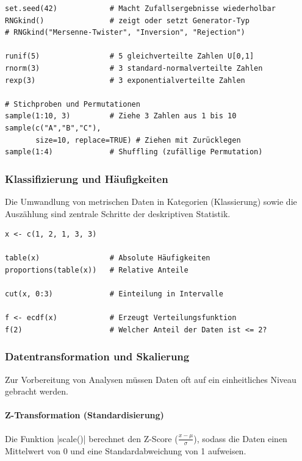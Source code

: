 \documentclass[10pt,twocolumn]{scrartcl}
\renewcommand{\lstinline}{\mycoloredinline}
\begin{document}
\begin{lstlisting}
set.seed(42)            # Macht Zufallsergebnisse wiederholbar
RNGkind()               # zeigt oder setzt Generator-Typ
# RNGkind("Mersenne-Twister", "Inversion", "Rejection")

runif(5)                # 5 gleichverteilte Zahlen U[0,1]
rnorm(3)                # 3 standard-normalverteilte Zahlen
rexp(3)                 # 3 exponentialverteilte Zahlen

# Stichproben und Permutationen
sample(1:10, 3)         # Ziehe 3 Zahlen aus 1 bis 10
sample(c("A","B","C"), 
       size=10, replace=TRUE) # Ziehen mit Zurücklegen
sample(1:4)             # Shuffling (zufällige Permutation)
\end{lstlisting}


\subsubsection{Klassifizierung und Häufigkeiten}

Die Umwandlung von metrischen Daten in Kategorien (Klassierung) sowie die Auszählung sind zentrale Schritte der deskriptiven Statistik.

\begin{lstlisting}
x <- c(1, 2, 1, 3, 3)

table(x)                # Absolute Häufigkeiten
proportions(table(x))   # Relative Anteile

cut(x, 0:3)             # Einteilung in Intervalle

f <- ecdf(x)            # Erzeugt Verteilungsfunktion
f(2)                    # Welcher Anteil der Daten ist <= 2?
\end{lstlisting}


\subsubsection{Datentransformation und Skalierung}

Zur Vorbereitung von Analysen müssen Daten oft auf ein einheitliches Niveau gebracht werden.


\paragraph{Z-Transformation (Standardisierung)}

Die Funktion \lstinline|scale()| berechnet den Z-Score ($\frac{x - \mu}{\sigma}$), sodass die Daten einen Mittelwert von 0 und eine Standardabweichung von 1 aufweisen. 
\end{document}
